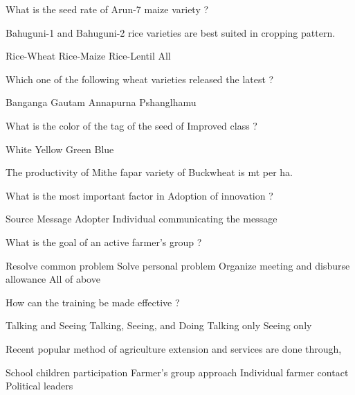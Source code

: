 \begin{questions}
\question What is the seed rate of Arun-7 maize variety ?
\begin{choices}
\end{choices}

\question Bahuguni-1 and Bahuguni-2 rice varieties are best suited in \fillin[][3cm] cropping pattern.
\begin{choices}
\choice Rice-Wheat
\choice Rice-Maize
\choice Rice-Lentil
\CorrectChoice All
\end{choices}

\question Which one of the following wheat varieties released the latest ?
\begin{choices}
\CorrectChoice Banganga
\choice Gautam
\choice Annapurna
\choice Pshanglhamu
\end{choices}

\question What is the color of the tag of the seed of Improved class ?
\begin{choices}
\choice White
\CorrectChoice Yellow
\choice Green
\choice Blue
\end{choices}

\question The productivity of Mithe fapar variety of Buckwheat is \fillin[][3cm] mt per ha.
\begin{choices}
\end{choices}

\question What is the most important factor in Adoption of innovation ?
\begin{choices}
\choice Source
\choice Message
\CorrectChoice Adopter
\choice Individual communicating the message
\end{choices}

\question What is the goal of an active farmer's group ?
\begin{choices}
\CorrectChoice Resolve common problem
\choice Solve personal problem
\choice Organize meeting and disburse allowance
\choice All of above
\end{choices}

\question How can the training be made effective ?
\begin{choices}
\choice Talking and Seeing
\CorrectChoice Talking, Seeing, and Doing
\choice Talking only
\choice Seeing only
\end{choices}

\question Recent popular method of agriculture extension and services are done through,
\begin{choices}
\choice School children participation
\CorrectChoice Farmer's group approach
\choice Individual farmer contact
\choice Political leaders
\end{choices}


\end{questions}
